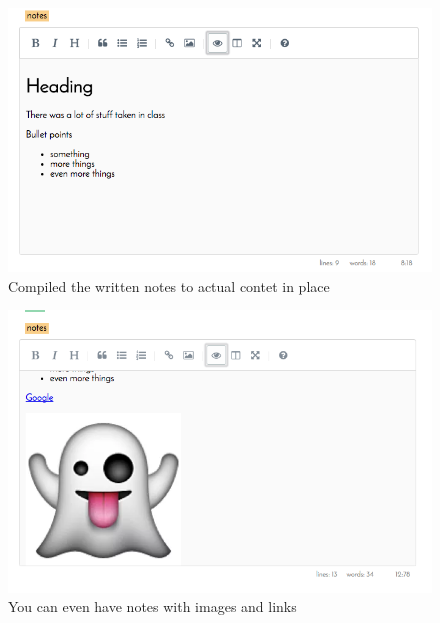 \begin{figure}[htb]
    \centering
    \includegraphics[width=\linewidth]{notescompiled.png}
    \caption{Compiled the written notes to actual contet in place}
    \label{fig:notescompiled} %
\end{figure}

\begin{figure}[htb]
    \centering
    \includegraphics[width=\linewidth]{noteswithimages.png}
    \caption{You can even have notes with images and links}
    \label{fig:noteswithimages} %
\end{figure}

